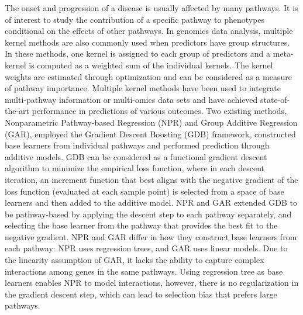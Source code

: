 \documentclass[a4paper,12pt]{article}
\begin{document}
	The onset and progression of a disease is usually affected by many pathways.\cite{shou2004mechanisms, shtivelman2014molecular, berk2009neuroprogression} It is of interest to study the contribution of a specific pathway to phenotypes conditional on the effects of other pathways. In genomics data analysis, multiple kernel methods \cite{gonen2014drug, aiolli2015easymkl} are also commonly used when predictors have group structures. In these methods, one kernel is assigned to each group of predictors and a meta-kernel is computed as a weighted sum of the individual kernels. The kernel weights are estimated through optimization and can be considered as a measure of pathway importance. Multiple kernel methods have been used to integrate multi-pathway information or multi-omics data sets and have achieved state-of-the-art performance in predictions of various outcomes.\cite{costello2014community, friedrichs2017pathway, manica2019pimkl} Two existing methods, Nonparametric Pathway-based Regression (NPR)\cite{wei2007nonparametric} and Group Additive Regression (GAR),\cite{luan2007group} employed the Gradient Descent Boosting (GDB)\cite{friedman2001greedy} framework, constructed base learners from individual pathways and performed prediction through additive models. GDB can be considered as a functional gradient descent algorithm to minimize the empirical loss function, where in each descent iteration, an increment function that best aligns with the negative gradient of the loss function (evaluated at each sample point) is selected from a space of base learners and then added to the additive model. NPR and GAR extended GDB to be pathway-based by applying the descent step to each pathway separately, and selecting the base learner from the pathway that provides the best fit to the negative gradient. NPR and GAR differ in how they construct base learners from each pathway: NPR uses regression trees, and GAR uses linear models. Due to the linearity assumption of GAR, it lacks the ability to capture complex interactions among genes in the same pathways. Using regression tree as base learners enables NPR to model interactions, however, there is no regularization in the gradient descent step, which can lead to selection bias that prefers large pathways.
	
\end{document}
